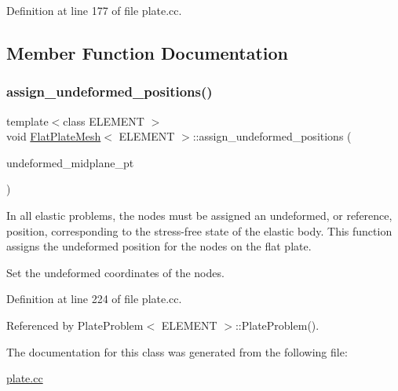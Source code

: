 Definition at line 177 of file plate.\+cc.



\subsection{Member Function Documentation}
\mbox{\label{classFlatPlateMesh_ad1c2d7972207aa87f17409d5d62e82fc}} 
\subsubsection{\texorpdfstring{assign\+\_\+undeformed\+\_\+positions()}{assign\_undeformed\_positions()}}
{\footnotesize\ttfamily template$<$class E\+L\+E\+M\+E\+NT $>$ \\
void \hyperlink{classFlatPlateMesh}{Flat\+Plate\+Mesh}$<$ E\+L\+E\+M\+E\+NT $>$\+::assign\+\_\+undeformed\+\_\+positions (\begin{DoxyParamCaption}\item[{Geom\+Object $\ast$const \&}]{undeformed\+\_\+midplane\+\_\+pt }\end{DoxyParamCaption})}



In all elastic problems, the nodes must be assigned an undeformed, or reference, position, corresponding to the stress-\/free state of the elastic body. This function assigns the undeformed position for the nodes on the flat plate. 

Set the undeformed coordinates of the nodes. 

Definition at line 224 of file plate.\+cc.



Referenced by Plate\+Problem$<$ E\+L\+E\+M\+E\+N\+T $>$\+::\+Plate\+Problem().



The documentation for this class was generated from the following file\+:\begin{DoxyCompactItemize}
\item 
\hyperlink{plate_8cc}{plate.\+cc}\end{DoxyCompactItemize}
